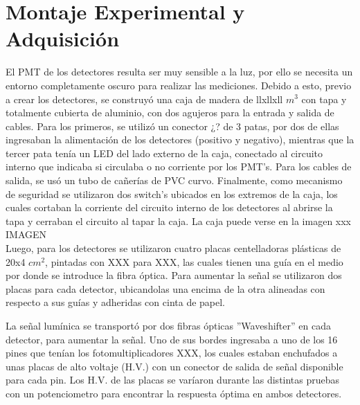 \documentclass[12pt,a4paper]{article}
\numberwithin{equation}{section}
\begin{document}
\section{Montaje Experimental y Adquisición}

El PMT de los detectores resulta ser muy sensible a la luz, por ello se necesita un entorno completamente oscuro para realizar las mediciones. Debido a esto, previo a crear los detectores, se construyó una caja de madera de llxllxll $ m^3 $ con tapa y totalmente cubierta de aluminio, con dos agujeros para la entrada y salida de cables. Para los primeros, se utilizó un conector ¿? de 3 patas, por dos de ellas ingresaban la alimentación de los detectores (positivo y negativo), mientras que la tercer pata tenía un LED del lado externo de la caja, conectado al circuito interno que indicaba si circulaba o no corriente por los PMT's. Para los cables de salida, se usó un tubo de cañerías de PVC curvo. 
Finalmente, como mecanismo de seguridad se utilizaron dos switch's ubicados en los extremos de la caja, los cuales cortaban la corriente del circuito interno de los detectores al abrirse la tapa y cerraban el circuito al tapar la caja. La caja puede verse en la imagen xxx\\

IMAGEN\\

 
Luego, para los detectores se utilizaron cuatro placas centelladoras plásticas de 20x4 $ cm^2 $, pintadas con XXX para XXX, las cuales tienen una guía en el medio por donde se introduce la fibra óptica. Para aumentar la señal se utilizaron dos placas para cada detector, ubicandolas una encima de la otra alineadas con respecto a sus guías y adheridas con cinta de papel.

%
 
La señal lumínica se transportó por dos fibras ópticas ''Waveshifter'' en cada detector, para aumentar la señal. Uno de sus bordes ingresaba a uno de los 16 pines que tenían los fotomultiplicadores XXX, los cuales estaban enchufados a unas placas de alto voltaje (H.V.) con un conector de salida de señal disponible para cada pin. Los H.V. de las placas se varíaron durante las distintas pruebas con un potenciometro para encontrar la respuesta óptima en ambos detectores.
\end{document}
